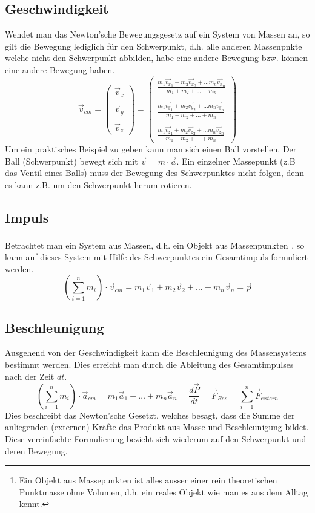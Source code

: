 \subsection{Geschwindigkeit}
Wendet man das Newton'sche Bewegungsgesetz auf ein System von
Massen an, so gilt die Bewegung lediglich für den Schwerpunkt,
d.h. alle anderen Massenpnkte welche nicht den Schwerpunkt abbilden,
habe eine andere Bewegung bzw. können eine andere Bewegung haben.
\[ \boxed{ \vec{v}_{cm} 
	=
	\begin{pmatrix}
		\vec{v}_x \\
		\\
		\vec{v}_y \\
		\\
		\vec{v}_z
	\end{pmatrix}
	=
	\begin{pmatrix}
		\displaystyle
		\frac{m_1 \vec{v_x}_1 
			+ m_2 \vec{v_x}_2 
			+ \dots m_n \vec{v_x}_n}
			{m_1 + m_2 + \dots + m_n} \\
		\\
		\displaystyle
		\frac{m_1 \vec{v_y}_1 
			+ m_2 \vec{v_y}_2 
			+ \dots m_n \vec{v_y}_n}
			{m_1 + m_2 + \dots + m_n} \\
		\\
		\displaystyle
		\frac{m_1 \vec{v_z}_1 
			+ m_2 \vec{v_z}_2 
			+ \dots m_n \vec{v_z}_n}
			{m_1 + m_2 + \dots + m_n}
	\end{pmatrix} }
\]
Um ein praktisches Beispiel zu geben kann man sich einen Ball vorstellen.
Der Ball (Schwerpunkt) bewegt sich mit $\vec{v} = m \cdot \vec{a}$.
Ein einzelner Massepunkt (z.B das Ventil eines Balls) muss der Bewegung
des Schwerpunktes nicht folgen, denn es kann z.B. um den Schwerpunkt 
herum rotieren.

\subsection{Impuls}
Betrachtet man ein System aus Massen, d.h. ein Objekt aus 
Massenpunkten\footnote{Ein Objekt aus Massepunkten ist alles ausser 
einer rein theoretischen Punktmasse ohne Volumen, d.h. ein reales Objekt
wie man es aus dem Alltag kennt.}, so kann
auf dieses System mit Hilfe des Schwerpunktes ein Gesamtimpuls
formuliert werden.
\[ \boxed{
	\left( \sum_{i=1}^n m_i \right) \cdot \vec{v}_{cm} 
		= m_1 \vec{v}_1 + m_2 \vec{v}_2 + \dots + m_n \vec{v}_n
		=\vec{p} }
\]

\subsection{Beschleunigung}
Ausgehend von der Geschwindigkeit kann die Beschleunigung des 
Massensystems bestimmt werden. Dies erreicht man durch die 
Ableitung des Gesamtimpulses nach der Zeit $dt$.
\[ \boxed{
	\left( \sum_{i=1}^n m_i \right) \cdot \vec{a}_{cm} 
		= m_1 \vec{a}_1 + \dots + m_n \vec{a}_n
		= \frac{d \vec{P}}{dt} 
		= \vec{F}_{Res}
		= \sum_{i=1}^n \vec{F}_{extern} }
\]
Dies beschreibt das Newton'sche Gesetzt, welches besagt, dass die 
Summe der anliegenden (externen) Kräfte das Produkt aus Masse und
Beschleunigung bildet. Diese vereinfachte Formulierung bezieht sich
wiederum auf den Schwerpunkt und deren Bewegung.


